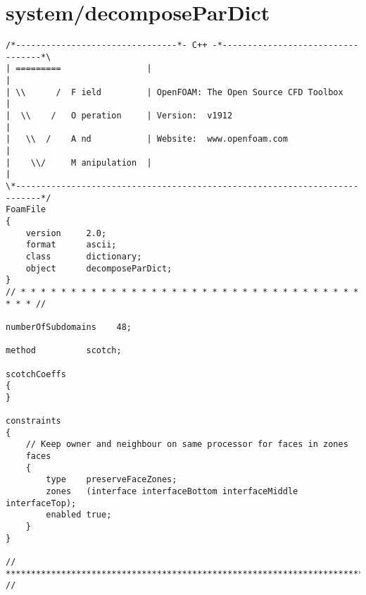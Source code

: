 \section{system/decomposeParDict}
\begin{lstlisting}
/*--------------------------------*- C++ -*----------------------------------*\
| =========                 |                                                 |
| \\      /  F ield         | OpenFOAM: The Open Source CFD Toolbox           |
|  \\    /   O peration     | Version:  v1912                                 |
|   \\  /    A nd           | Website:  www.openfoam.com                      |
|    \\/     M anipulation  |                                                 |
\*---------------------------------------------------------------------------*/
FoamFile
{
    version     2.0;
    format      ascii;
    class       dictionary;
    object      decomposeParDict;
}
// * * * * * * * * * * * * * * * * * * * * * * * * * * * * * * * * * * * * * //

numberOfSubdomains    48;

method          scotch;

scotchCoeffs
{
}

constraints
{
	// Keep owner and neighbour on same processor for faces in zones
	faces
    {
        type    preserveFaceZones;
        zones   (interface interfaceBottom interfaceMiddle interfaceTop);
        enabled true;
    }
}

// ************************************************************************* //

\end{lstlisting}

